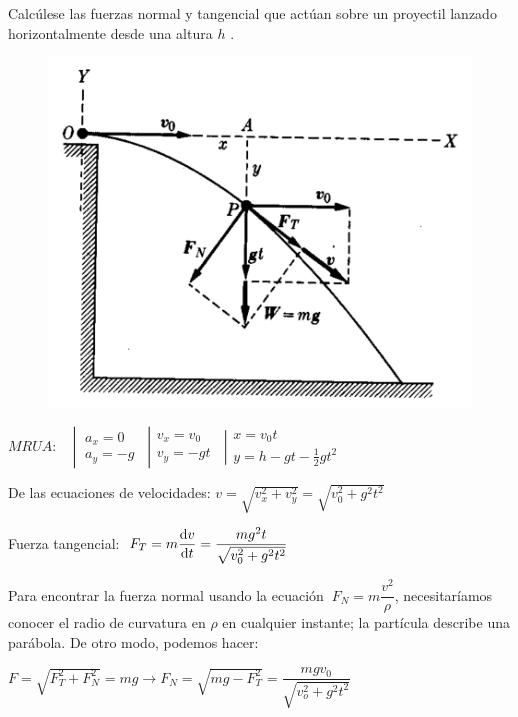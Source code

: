 \vspace{10mm} %
\begin{prob}
	\begin{multicols}{2}
$\quad$

$\quad$

Calcúlese las fuerzas normal y tangencial que actúan sobre un proyectil lanzado horizontalmente desde una altura $h$	.
\begin{figure}[H]
		\centering
		\includegraphics[width=.45\textwidth]{imagenes/imagenes03/T03IM57.png}
		\end{figure}
	\end{multicols}
\end{prob}


$MRUA:\quad \left| \begin{matrix}\ a_x=0 \quad \  \\ \ a_y=-g \     \end{matrix} \right|
\left. \begin{matrix}  v_x=v_0 \quad \ \\ v_y=-gt  \   \end{matrix} \right|
\left. \begin{matrix} x=v_0t  \quad \quad \quad \quad \ \\ y=h-gt-\frac 1 2 g t^2     \end{matrix} \right.$

De las ecuaciones de velocidades: $v=\sqrt{v_x^2+v_y^2}=\sqrt{v_0^2+g^2t^2}$

Fuerza tangencial: $\ F_T=\displaystyle m \dv{v}{t}=\dfrac{mg^2t}{\sqrt{v_0^2+g^2t^2}}$

Para encontrar la fuerza normal usando la ecuación $\ F_N=\displaystyle m\dfrac{v^2}{\rho}$, necesitaríamos conocer el radio de curvatura en $\rho$ en cualquier instante; la partícula describe una parábola. De otro modo, podemos hacer:

$F=\sqrt{F_T^2+F_N^2}=mg \to F_N=\sqrt{mg-F_T^2}=\dfrac{mgv_0}{\sqrt{v_o^2+g^2t^2}}$


